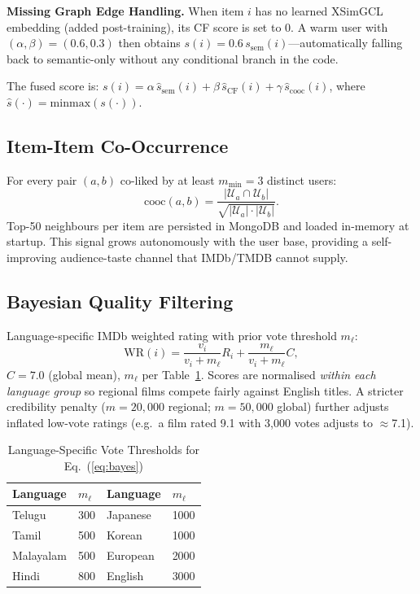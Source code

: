 \documentclass[conference]{IEEEtran}
\begin{document}
\textbf{Missing Graph Edge Handling.}
When item $i$ has no learned XSimGCL embedding (added post-training),
its CF score is set to 0.
A warm user with $(\alpha,\beta)=(0.6,0.3)$ then obtains
$s(i)=0.6\,s_\text{sem}(i)$---automatically falling back to
semantic-only without any conditional branch in the code.

The fused score is:
$s(i) = \alpha\,\hat{s}_\text{sem}(i) + \beta\,\hat{s}_\text{CF}(i)
       + \gamma\,\hat{s}_\text{cooc}(i)$,
where $\hat{s}(\cdot)=\mathrm{minmax}(s(\cdot))$.

\subsection{Item-Item Co-Occurrence}

For every pair $(a,b)$ co-liked by at least $m_\text{min}=3$ distinct
users:
\begin{equation}
  \mathrm{cooc}(a,b)=\frac{|\mathcal{U}_a\cap\mathcal{U}_b|}
                          {\sqrt{|\mathcal{U}_a|\cdot|\mathcal{U}_b|}}.
\end{equation}
Top-50 neighbours per item are persisted in MongoDB and loaded in-memory
at startup.
This signal grows autonomously with the user base, providing a
self-improving audience-taste channel that IMDb/TMDB cannot supply.

\subsection{Bayesian Quality Filtering}

Language-specific IMDb weighted rating with prior vote threshold $m_\ell$:
\begin{equation}
  \mathrm{WR}(i) = \frac{v_i}{v_i+m_\ell}R_i
               + \frac{m_\ell}{v_i+m_\ell}C,
  \label{eq:bayes}
\end{equation}
$C=7.0$ (global mean), $m_\ell$ per Table~\ref{tab:votethresh}.
Scores are normalised \emph{within each language group} so regional films
compete fairly against English titles.
A stricter credibility penalty ($m=20{,}000$ regional; $m=50{,}000$
global) further adjusts inflated low-vote ratings
(e.g.\ a film rated 9.1 with 3,000 votes adjusts to $\approx$7.1).

\begin{table}[h]
\caption{Language-Specific Vote Thresholds for Eq.~(\ref{eq:bayes})}
\label{tab:votethresh}
\centering\small
\begin{tabular}{ll|ll}
\toprule
\textbf{Language} & $m_\ell$ & \textbf{Language} & $m_\ell$ \\
\midrule
Telugu    & 300  & Japanese  & 1000 \\
Tamil     & 500  & Korean    & 1000 \\
Malayalam & 500  & European  & 2000 \\
Hindi     & 800  & English   & 3000 \\
\bottomrule
\end{tabular}
\end{table}
\end{document}
